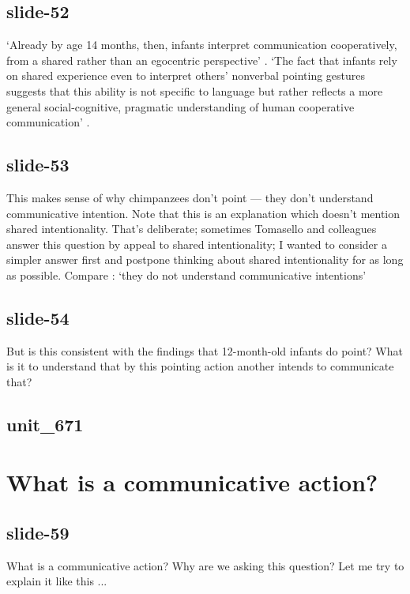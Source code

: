 \documentclass[12pt,\papersize]{extarticle}
\begin{document}
 
\subsection{slide-52}
‘Already by age 14 months, then, infants interpret communication cooperatively, from a shared rather than an egocentric perspective’ \citep[p.\ 269]{Liebal:2010lr}.
‘The fact that infants rely on shared experience even to interpret others’ nonverbal pointing gestures suggests that this ability is not specific to language but rather reflects a more general social-cognitive, pragmatic understanding of human cooperative communication’ \citep[p.\ 270]{Liebal:2010lr}.
 
 
\subsection{slide-53}
This makes sense of why chimpanzees don't point --- they don't understand communicative intention.
Note that this is an explanation which doesn't mention shared intentionality.
That's deliberate; sometimes Tomasello and colleagues answer this question by appeal to shared intentionality; I wanted to consider a simpler answer first and postpone thinking about shared intentionality for as long as possible.
Compare \citep[p.\ 516]{Tomasello:2010dy}: ‘they do not understand communicative intentions’
 
 
\subsection{slide-54}
But is this consistent with the findings that 12-month-old infants do point?
What is it to understand that by this pointing action another intends to communicate that?
 
 
\subsection{unit\_671}
 
\section{What is a communicative action?}
 
 
\subsection{slide-59}
What is a communicative action?
Why are we asking this question?
Let me try to explain it like this ...
 
\end{document}

